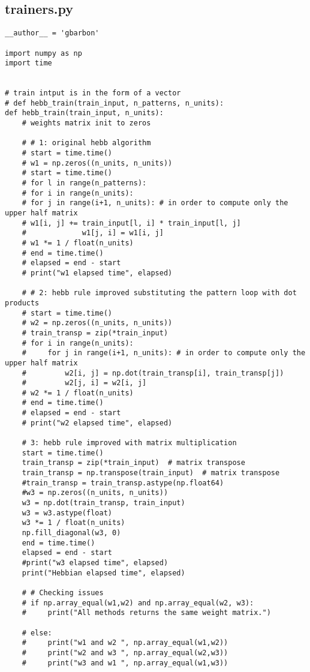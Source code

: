 \documentclass[letterpaper,twocolumn,10pt]{article}
\begin{document}
\subsection{trainers.py}
\begin{lstlisting}
__author__ = 'gbarbon'

import numpy as np
import time


# train intput is in the form of a vector
# def hebb_train(train_input, n_patterns, n_units):
def hebb_train(train_input, n_units):
    # weights matrix init to zeros

    # # 1: original hebb algorithm
    # start = time.time()
    # w1 = np.zeros((n_units, n_units))
    # start = time.time()
    # for l in range(n_patterns):
    # for i in range(n_units):
    # for j in range(i+1, n_units): # in order to compute only the upper half matrix
    # w1[i, j] += train_input[l, i] * train_input[l, j]
    #             w1[j, i] = w1[i, j]
    # w1 *= 1 / float(n_units)
    # end = time.time()
    # elapsed = end - start
    # print("w1 elapsed time", elapsed)

    # # 2: hebb rule improved substituting the pattern loop with dot products
    # start = time.time()
    # w2 = np.zeros((n_units, n_units))
    # train_transp = zip(*train_input)
    # for i in range(n_units):
    #     for j in range(i+1, n_units): # in order to compute only the upper half matrix
    #         w2[i, j] = np.dot(train_transp[i], train_transp[j])
    #         w2[j, i] = w2[i, j]
    # w2 *= 1 / float(n_units)
    # end = time.time()
    # elapsed = end - start
    # print("w2 elapsed time", elapsed)

    # 3: hebb rule improved with matrix multiplication
    start = time.time()
    train_transp = zip(*train_input)  # matrix transpose
    train_transp = np.transpose(train_input)  # matrix transpose
    #train_transp = train_transp.astype(np.float64)
    #w3 = np.zeros((n_units, n_units))
    w3 = np.dot(train_transp, train_input)
    w3 = w3.astype(float)
    w3 *= 1 / float(n_units)
    np.fill_diagonal(w3, 0)
    end = time.time()
    elapsed = end - start
    #print("w3 elapsed time", elapsed)
    print("Hebbian elapsed time", elapsed)

    # # Checking issues
    # if np.array_equal(w1,w2) and np.array_equal(w2, w3):
    #     print("All methods returns the same weight matrix.")

    # else:
    #     print("w1 and w2 ", np.array_equal(w1,w2))
    #     print("w2 and w3 ", np.array_equal(w2,w3))
    #     print("w3 and w1 ", np.array_equal(w1,w3))


\end{lstlisting}
\end{document}
